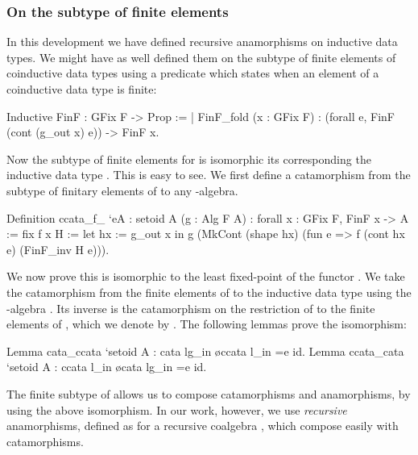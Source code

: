 \documentclass{llncs}
\begin{document}
\subsubsection{On the subtype of finite elements}
In this development we have defined recursive anamorphisms on inductive data
types. We might have as well defined them on the subtype of finite elements of
coinductive data types using a predicate which states when an element of a
coinductive data type is finite:
\begin{coqcode}
Inductive FinF : GFix F -> Prop :=
| FinF_fold (x : GFix F) : (forall e, FinF (cont (g_out x) e)) -> FinF x.
\end{coqcode}
Now the subtype  of finite elements for 
is isomorphic its corresponding the inductive data type . This is
easy to see. We first define a catamorphism  from the
subtype  of finitary elements of  to
any -algebra.
\begin{coqcode}
Definition ccata_f_ `{eA : setoid A} (g : Alg F A)
  : forall x : GFix F, FinF x -> A := fix f x H :=
    let hx := g_out x in
      g (MkCont (shape hx) (fun e => f (cont hx e) (FinF_inv H e))).
\end{coqcode}
We now prove this is isomorphic to the least fixed-point of the functor
.
We take the catamorphism from the finite elements of  to the
inductive data type  using the -algebra . Its
inverse is the catamorphism on the restriction of  to the finite
elements of , which we denote by .  The following lemmas
prove the isomorphism:
\begin{coqcode}
Lemma cata_ccata `{setoid A} : cata lg_in \o ccata l_in =e id.
Lemma ccata_cata `{setoid A} : ccata l_in \o cata lg_in =e id.
\end{coqcode}
The finite subtype of  allows us to compose
catamorphisms and anamorphisms, by using the above isomorphism. In our work,
however, we use \emph{recursive} anamorphisms, defined as  for
a recursive coalgebra , which compose easily with
catamorphisms.
\end{document}
